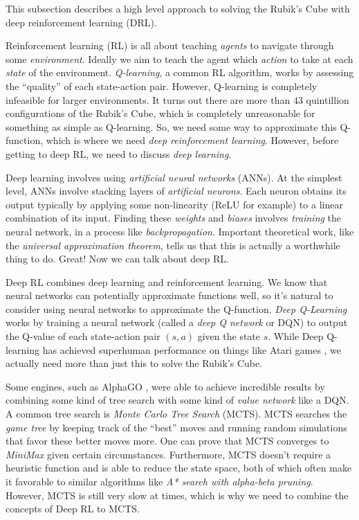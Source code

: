 \documentclass[12pt,oneside,oldfontcommands]{memoir}
\theoremstyle{definition}
\begin{document}
\begin{Subsection}
This subsection describes a high level approach to solving the Rubik's Cube with deep reinforcement learning (DRL). 

\tcblower

Reinforcement learning (RL) is all about teaching \textit{agents} to navigate through some \textit{environment}. Ideally we aim to teach the agent which \textit{action} to take at each \textit{state} of the environment. \textit{Q-learning}, a common RL algorithm, works by assessing the ``quality'' of each state-action pair. However, Q-learning is completely infeasible for larger environments. It turns out there are more than $43$ quintillion configurations of the Rubik's Cube, which is completely unreasonable for something as simple as Q-learning. So, we need some way to approximate this Q-function, which is where we need \textit{deep reinforcement learning}. However, before getting to deep RL, we need to discuss \textit{deep learning}. 

Deep learning involves using \textit{artificial neural networks} (ANNs). At the simplest level, ANNs involve stacking layers of \textit{artificial neurons}. Each neuron obtains its output typically by applying some non-linearity (ReLU for example) to a linear combination of its input. Finding these \textit{weights} and \textit{biases} involves \textit{training} the neural network, in a process like \textit{backpropagation}. Important theoretical work, like the \textit{universal approximation theorem}, tells us that this is actually a worthwhile thing to do. Great! Now we can talk about deep RL.

Deep RL combines deep learning and reinforcement learning. We know that neural networks can potentially approximate functions well, so it's natural to consider using neural networks to approximate the Q-function. \textit{Deep Q-Learning} works by training a neural network (called a \textit{deep Q network} or DQN) to output the Q-value of each state-action pair $(s,a)$ given the state $s$. While Deep Q-learning has achieved superhuman performance on things like Atari games \cite{atari, DDQN}, we actually need more than just this to solve the Rubik's Cube.

Some engines, such as AlphaGO \cite{AlphaGo}, were able to achieve incredible results by combining some kind of tree search with some kind of \textit{value network} like a DQN. A common tree search is \textit{Monte Carlo Tree Search} (MCTS). MCTS searches the \textit{game tree} by keeping track of the ``best'' moves and running random simulations that favor these better moves more. One can prove that MCTS converges to \textit{MiniMax} given certain circumstances. Furthermore, MCTS doesn't require a heuristic function and is able to reduce the state space, both of which often make it favorable to similar algorithms like \textit{A* search with alpha-beta pruning}. However, MCTS is still very slow at times, which is why we need to combine the concepts of Deep RL to MCTS.


\end{Subsection}
\end{document}
